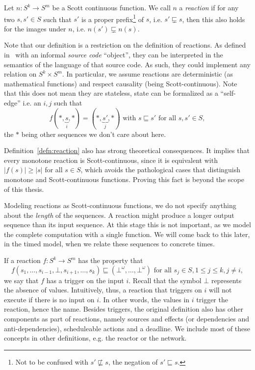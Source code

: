 \begin{defn}[Reaction]
    \label{defn:reaction}
Let $n : S^k \rightarrow S^m$ be a Scott continuous function. 
We call $n$ a \emph{reaction} if for any two $s, s' \in S$ such that $s'$ is a proper prefix\footnote{Not to be confused with $s' \not \sqsubseteq s$, the negation of $s' \sqsubseteq s$.} of $s$, i.e. $s' \sqsubsetneq s$, then this also holds for the images under $n$, i.e. $n(s') \sqsubsetneq n(s)$.
\end{defn}

Note that our definition is a restriction on the definition of reactions.
As defined in~\cite{lohstroh_cyphy19} with an informal \emph{source code} ``object'', they can be interpreted in the semantics of the language of that source code.
As such, they could implement any relation on $S^k \times S^m$.
In particular, we assume reactions are deterministic (as mathematical functions) and respect causality (being Scott-continuous).
Note that this does not mean they are stateless, state can be formalized as a ``self-edge'' i.e. an $i,j$ such that
\[ f(*,\underbrace{s}_{i},*) = (*,\underbrace{s'}_{j},*) \text{ with } s \sqsubseteq s' \text{ for all } s,s' \in S, \]
the $*$ being other sequences we don't care about here.

Definition~\ref{defn:reaction} also has strong theoretical consequences.
It implies that every monotone reaction is Scott-continuous, since it is equivalent with $|f(s)| \geq |s|$ for all $s \in S$, which avoids the pathological cases that distinguish monotone and Scott-continuous functions.
Proving this fact is beyond the scope of this thesis.

Modeling reactions as Scott-continuous functions, we do not specify anything about the \emph{length} of the sequences.
A reaction might produce a longer output sequence than its input sequence. At this stage this is not important, as we model the complete computation with a single function.
We will come back to this later, in the timed model, when we relate these sequences to concrete times.

If a reaction $f : S^k \rightarrow S^m$ has the property that
\[ f(s_1,\ldots,s_{i-1},\bot,s_{i+1},\ldots,s_k) \sqsubseteq (\bot^\omega,\ldots,\bot^\omega)\text{ for all }s_j \in S, 1 \leq j \leq k, j \neq i,\]
 we say that $f$ has a trigger on the input $i$.
Recall that the symbol $\bot$ represents the absence of values.
Intuitively, thus, a reaction that triggers on $i$ will not execute if there is no input on $i$.
In other words, the values in $i$ trigger the reaction, hence the name.
Besides triggers, the original definition also has other components as part of reactions, namely sources and effects (or dependencies and anti-dependencies), scheduleable actions and a deadline.
We include most of these concepts in other definitions, e.g. the reactor or the network.

